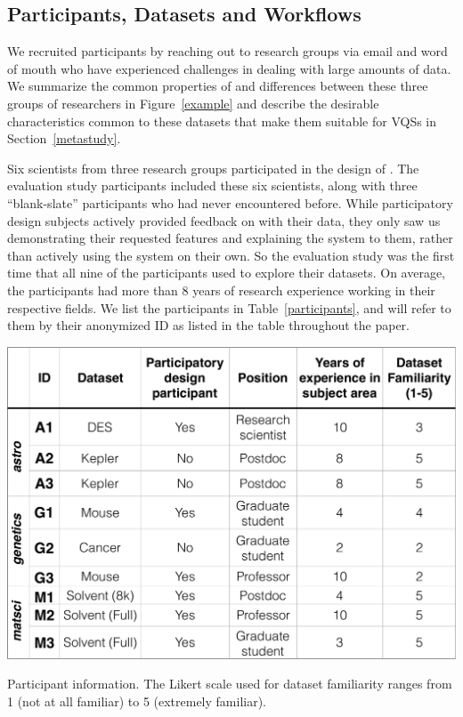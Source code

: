 \subsection{Participants, Datasets and Workflows}
We recruited participants by reaching out to research groups via email and word of mouth who have experienced challenges in dealing with large amounts of data. 
 We summarize the common properties of and differences between these three groups of researchers in Figure~\ref{example} and describe the desirable characteristics common to these datasets that make them suitable for VQSs in Section~\ref{metastudy}.
\par Six scientists from three research groups participated in the design of \zv. The evaluation study participants included these six scientists, along with three ``blank-slate'' participants who had never encountered \zv before. While participatory design subjects actively provided feedback on \zv with their data, they only saw us demonstrating their requested features and explaining the system to them, rather than actively using the system on their own. So the evaluation study was the first time that all nine of the participants used \zv to explore their datasets. On average, the participants had more than 8 years of research experience working in their respective fields. We list the participants in Table~\ref{participants}, and will refer to them by their anonymized ID as listed in the table throughout the paper. 
\begin{table}[h]
\centering
\vspace{-10pt}
\includegraphics[width=\linewidth]{figures/participants.pdf}
\caption{Participant information. The Likert scale used for dataset familiarity ranges from 1 (not at all familiar) to 5 (extremely familiar).}
\label{participants}
\vspace{-10pt}
\end{table}
